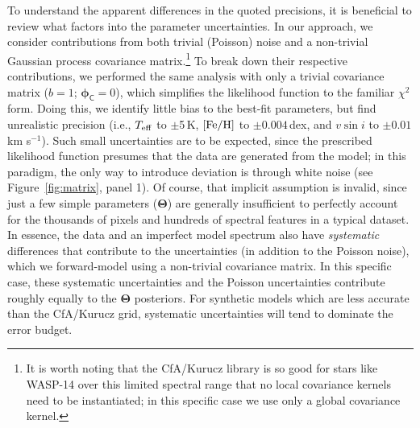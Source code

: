 \documentclass[iop,floatfix]{emulateapj}
\newcommand{\vT}{ {\bm \Theta}}
\newcommand{\vp}{ {\bm \phi}}
\newcommand{\cov}{ \vp_{\mathsf{C}}}
\begin{document}
To understand the apparent differences in the quoted precisions, it is beneficial to review what factors 
into the parameter uncertainties.  In our approach, we consider contributions from both trivial 
(Poisson) noise and a non-trivial Gaussian process covariance matrix.\footnote{It is worth noting 
that the {\sc CfA/Kurucz} library is so good for stars like WASP-14 over this limited spectral 
range that no local covariance kernels need to be instantiated; in this specific case we use only a 
global covariance kernel.}  To break down their respective contributions, we performed the 
same analysis with only a trivial covariance matrix ($b = 1$; $\cov = 0$), which simplifies the 
likelihood function to the familiar $\chi^2$ form.  Doing this, we identify little bias to the 
best-fit parameters, but find unrealistic precision (i.e., $T_{\rm eff}$ to $\pm$5\,K, 
$[{\rm Fe/H}]$ to $\pm0.004$\,dex, and $v \sin i$ to $\pm0.01$\,km s$^{-1}$).  Such small 
uncertainties are to be expected, since the prescribed likelihood function presumes that the data 
are generated from the model; in this paradigm, the only way to introduce deviation is through 
white noise (see Figure~\ref{fig:matrix}, panel 1).  Of course, that implicit assumption is invalid, since just a few simple parameters 
($\vT$) are generally insufficient to perfectly account for the thousands of pixels and hundreds of 
spectral features in a typical dataset.  In essence, the data and an imperfect model spectrum also 
have {\it systematic} differences that contribute to the uncertainties (in addition to the Poisson 
noise), which we forward-model using a non-trivial covariance matrix.  In this specific case, these 
systematic uncertainties and the Poisson uncertainties contribute roughly equally to the $\vT$
posteriors. For synthetic models which are less accurate than the {\sc CfA/Kurucz} grid, systematic uncertainties will tend to dominate the error budget.
\end{document}
